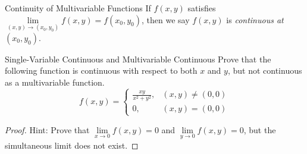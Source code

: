 \begin{definition}{Continuity of Multivariable Functions}{}
  If $f(x, y)$ satisfies $\lim \limits _{(x,y)\rightarrow (x_0, y_0)} f(x,y) =
  f(x_0, y_0)$,
  then we say $f(x,y)$ is \emph{continuous at $(x_0, y_0)$}.
\end{definition}

\begin{example}{Single-Variable Continuous and Multivariable Continuous}{}
  Prove that the following function is continuous with respect to both $x$ and
  $y$,
  but not continuous as a multivariable function.
  \begin{equation}
    f(x,y)=\begin{cases}
      \frac{xy}{x^2+y^2},&(x,y)\neq(0,0)\\
      0,&(x,y)=(0,0)
    \end{cases}
  \end{equation}
\end{example}

\begin{proof}
  Hint: Prove that $\lim \limits _{x \rightarrow 0} f(x,y) = 0$ and $\lim
  \limits _{y \rightarrow 0} f(x,y) = 0$,
  but the simultaneous limit does not exist.
\end{proof}

